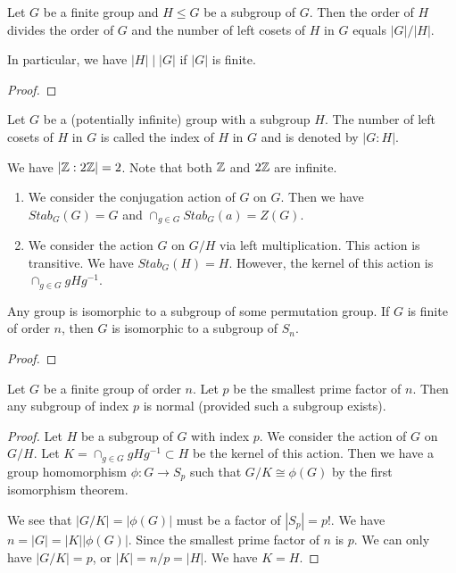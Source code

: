 \begin{thm}Let $G$ be a finite group and $H \le G$ be a subgroup of $G$. Then the order of $H$ divides the order of $G$ and the number of left cosets of $H$ in $G$ equals $|G| / |H|$.

    In particular, we have $|H| \mid |G|$ if $|G|$ is finite.
\end{thm}

\begin{proof}

\end{proof}

\begin{defi}
    Let $G$ be a (potentially infinite) group with a subgroup $H$. The number of left cosets of $H$ in $G$ is called the index of $H$ in $G$ and is denoted by $|G : H|$.
\end{defi}

\begin{example}
    We have $|\mathbb {Z} : 2\mathbb {Z}| =2$. Note that both $\mathbb {Z}$ and $2\mathbb {Z}$ are infinite.
\end{example}

\begin{example}
    \begin{enumerate}
        \item We consider the conjugation action of $G$ on $G$. Then we have $Stab_G(G) = G$ and  $\cap_{g \in G} Stab_G(a) = Z(G)$.
        \item We consider the action $G$ on $G/H$ via left multiplication. This action is transitive. We have $Stab_G(H) = H$. However, the kernel of this action is $\cap_{g \in G} g H g^{-1}$.
    \end{enumerate}
\end{example}


\begin{thm}
    Any group is isomorphic to a subgroup of some permutation group. If $G$ is finite of order $n$, then $G$ is isomorphic to a subgroup of $S_n$.
\end{thm}
\begin{proof}
\end{proof}

\begin{prop}
    Let $G$ be a finite group of order $n$. Let $p$ be the smallest prime factor of $n$. Then any subgroup of index $p$ is normal (provided such a subgroup exists).
\end{prop}

\begin{proof}
    Let $H$ be a subgroup of $G$ with index $p$. We consider the action of $G$ on $G/H$. Let $K = \cap_{g \in G} g H g^{-1} \subset H$ be the kernel of this action. Then we have a group homomorphism $\phi: G \rightarrow S_p$ such that $G/K \cong \phi(G)$ by the first isomorphism theorem.

    We see that $|G/K| = | \phi(G)|$ must be a factor of $|S_p| = p!$. We have $n =|G| = |K| | \phi(G)|$. Since the smallest prime factor of $n$ is $p$. We can only have $|G/K| = p$, or $|K| = n/p = |H|$. We have $K= H$.
\end{proof}

